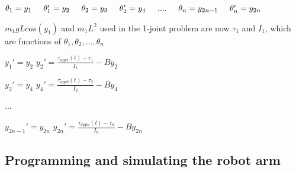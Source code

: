 \documentclass{article}
\begin{document}
\vspace{24pt}
\centering $\theta_1 = y_1  \hspace{0.5cm}  \theta_1' = y_2  \hspace{0.5cm}  \theta_2 = y_3  \hspace{0.5cm}  \theta_2' = y_4 \hspace{0.5cm} ....\hspace{0.5cm} \theta_n = y_{2n-1} \hspace{0.5cm} \theta_n' = y_{2n}$

\vspace{24pt}
\noindent \justifying $m_1gLcos(y_1)$ and ${m_1L^2}$ used in the 1-joint problem are now $\tau_1$ and $I_1$, which are functions of $\theta_1, \theta_2, ..., \theta_n$
\vspace{24pt}

\centering$y_1' = y_2$   \hspace{1cm}  $y_2' = \frac{\tau_{app1}(t) - \tau_1}{I_1} - By_2$ 

\vspace{10pt}

\centering$y_3' = y_4$   \hspace{1cm}  $y_4' = \frac{\tau_{app2}(t) - \tau_2}{I_2} - By_4$

\vspace{10pt}

\centering $...$

\vspace{10pt}

\centering$y_{2n-1}' = y_{2n}$   \hspace{1cm}  $y_{2n}' = \frac{\tau_{appn}(t) - \tau_n}{I_n} - By_{2n}$ \\ 

\vspace{24pt}

\newpage 

\subsection{Programming and simulating the robot arm}
\end{document}
